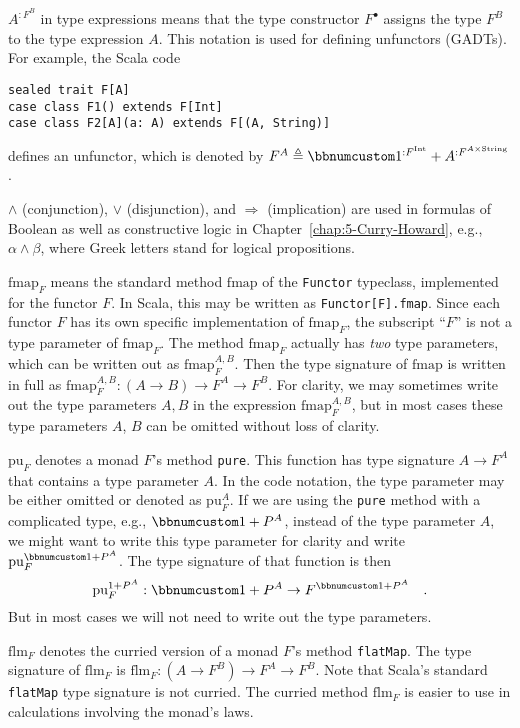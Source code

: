 $A^{:F^{B}}$ in type expressions means that the type constructor
$F^{\bullet}$ assigns the type $F^{B}$ to the type expression $A$.
This notation is used for defining unfunctors (GADTs). For example,
the Scala code

\begin{lstlisting}
sealed trait F[A]
case class F1() extends F[Int]
case class F2[A](a: A) extends F[(A, String)]
\end{lstlisting}
defines an unfunctor, which is denoted by $F^{A}\triangleq\bbnum 1^{:F^{\text{Int}}}+A^{:F^{A\times\text{String}}}$.

$\wedge$ (conjunction), $\vee$ (disjunction), and $\Rightarrow$
(implication) are used in formulas of Boolean as well as constructive
logic in Chapter~\ref{chap:5-Curry-Howard}, e.g., $\alpha\wedge\beta$,
where Greek letters stand for logical propositions.

$\text{fmap}_{F}$ means the standard method $\text{fmap}$ of the
\lstinline!Functor! typeclass, implemented for the functor $F$.
In Scala, this may be written as \texttt{}\lstinline!Functor[F].fmap!.
Since each functor $F$ has its own specific implementation of $\text{fmap}_{F}$,
the subscript \textsf{``}$F$\textsf{''} is not a type parameter of $\text{fmap}_{F}$.
The method $\text{fmap}_{F}$ actually has \emph{two} type parameters,
which can be written out as $\text{fmap}_{F}^{A,B}$. Then the type
signature of $\text{fmap}$ is written in full as $\text{fmap}_{F}^{A,B}:\left(A\rightarrow B\right)\rightarrow F^{A}\rightarrow F^{B}$.
For clarity, we may sometimes write out the type parameters $A,B$
in the expression $\text{fmap}_{F}^{A,B}$, but in most cases these
type parameters $A$, $B$ can be omitted without loss of clarity.

$\text{pu}_{F}$ denotes a monad $F$\textsf{'}s method \lstinline!pure!.
This function has type signature $A\rightarrow F^{A}$ that contains
a type parameter $A$. In the code notation, the type parameter may
be either omitted or denoted as $\text{pu}_{F}^{A}$. If we are using
the \lstinline!pure! method with a complicated type, e.g., $\bbnum 1+P^{A}$,
instead of the type parameter $A$, we might want to write this type
parameter for clarity and write $\text{pu}_{F}^{\bbnum 1+P^{A}}$.
The type signature of that function is then 
\[
\text{pu}_{F}^{1+P^{A}}:\bbnum 1+P^{A}\rightarrow F^{\bbnum 1+P^{A}}\quad.
\]
But in most cases we will not need to write out the type parameters.

$\text{flm}_{F}$ denotes the curried version of a monad $F$\textsf{'}s method
\lstinline!flatMap!. The type signature of $\text{flm}_{F}$ is $\text{flm}_{F}:(A\rightarrow F^{B})\rightarrow F^{A}\rightarrow F^{B}$.
Note that Scala\textsf{'}s standard \lstinline!flatMap! type signature is
not curried. The curried method $\text{flm}_{F}$ is easier to use
in calculations involving the monad\textsf{'}s laws.

